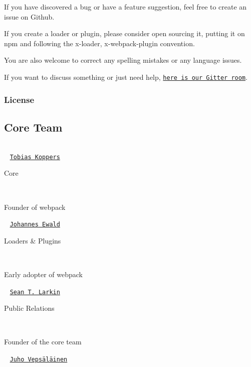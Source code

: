 If you have discovered a bug or have a feature suggestion, feel free to create an issue on Github.

If you create a loader or plugin, please consider open sourcing it, putting it on npm and following the {\ttfamily x-\/loader}, {\ttfamily x-\/webpack-\/plugin} convention.

You are also welcome to correct any spelling mistakes or any language issues.

If you want to discuss something or just need help, \href{https://gitter.im/webpack/webpack}{\tt here is our Gitter room}.

\subsubsection*{License}

\href{https://app.fossa.io/projects/git%2Bhttps%3A%2F%2Fgithub.com%2Fwebpack%2Fwebpack?ref=badge_large}{\tt }

\subsection*{Core Team}

\tabulinesep=1mm
\begin{longtabu} spread 0pt [c]{*{0}{|X[-1]}|}
\hline
\end{longtabu}


 ~\newline
 \href{https://github.com/sokra}{\tt Tobias Koppers} 

Core

~\newline
 

Founder of webpack

 ~\newline
 \href{https://github.com/jhnns}{\tt Johannes Ewald} 

Loaders \& Plugins

~\newline
 

Early adopter of webpack

 ~\newline
 \href{https://github.com/TheLarkInn}{\tt Sean T. Larkin} 

Public Relations

~\newline
 

Founder of the core team

 ~\newline
 \href{https://github.com/bebraw}{\tt Juho Vepsäläinen} 

